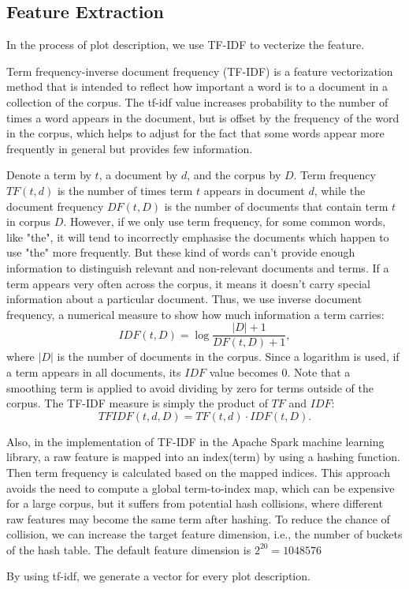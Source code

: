 \documentclass{vldb}
\begin{document}
\subsection{Feature Extraction}
\par In the process of plot description, we use TF-IDF to vecterize the feature.
\par Term frequency-inverse document frequency (TF-IDF) is a feature vectorization method that is intended to reflect how important a word is to a document in a collection of the corpus. The tf-idf value increases probability to the number of times a word appears in the document, but is offset by the frequency of the word in the corpus, which helps to adjust for the fact that some words appear more frequently in general but provides few information.
\par Denote a term by $t$, a document by $d$, and the corpus by $D$. Term frequency $TF(t,d)$ is the number of times term $t$ appears in document $d$, while the document frequency $DF(t,D)$ is the number of documents that contain term $t$ in corpus $D$. However, if we only use term frequency, for some common words, like "the", it will tend to incorrectly emphasise the documents which happen to use "the" more frequently. But these kind of words can't provide enough information to distinguish relevant and non-relevant documents and terms. If a term appears very often across the corpus, it means it doesn't carry special information about a particular document. Thus, we use inverse document frequency, a numerical measure to show how much information a term carries:
\begin{displaymath}
IDF(t,D) = \log\frac{|D|+1}{DF(t,D)+1},
\end{displaymath}
where $|D|$ is the number of documents in the corpus. Since a logarithm is used, if a term appears in all documents, its $IDF$ value becomes 0. Note that a smoothing term is applied to avoid dividing by zero for terms outside of the corpus. The TF-IDF measure is simply the product of $TF$ and $IDF$:
\begin{displaymath}
TFIDF(t,d,D)=TF(t,d)⋅IDF(t,D).
\end{displaymath} 
\par Also, in the implementation of TF-IDF in the Apache Spark machine learning library, a raw feature is mapped into an index(term) by using a hashing function. Then term frequency is calculated based on the mapped indices. This approach avoids the need to compute a global term-to-index map, which can be expensive for a large corpus, but it suffers from potential hash collisions, where different raw features may become the same term after hashing. To reduce the chance of collision, we can increase the target feature dimension, i.e., the number of buckets of the hash table. The default feature dimension is $2^{20}=1048576$
\par By using tf-idf, we generate a vector for every plot description.
\end{document}
